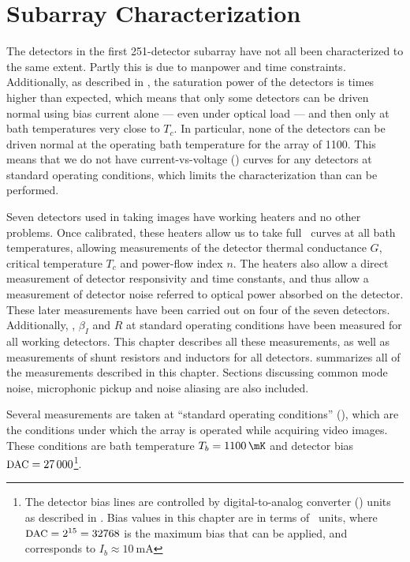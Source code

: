 \chapter{Subarray Characterization}\label{c:det-array}

The detectors in the first 251-detector subarray have not all been characterized to the same extent.
Partly this is due to manpower and time constraints.
Additionally, as described in , the saturation power of the detectors is  times higher than expected, which means that only some detectors can be driven normal using bias current alone --- even under optical load --- and then only at bath temperatures very close to $T_c$.
In particular, none of the detectors can be driven normal at the operating bath temperature for the array of \SI{1100}{\mK}.
This means that we do not have current-vs-voltage (\IV) curves for any detectors at standard operating conditions, which limits the characterization than can be performed.

Seven detectors used in taking images have working heaters and no other problems.
Once calibrated, these heaters allow us to take full \IV\ curves at all bath temperatures, allowing measurements of the detector thermal conductance $G$, critical temperature $T_c$ and power-flow index $n$.
The heaters also allow a direct measurement of detector responsivity and time constants, and thus allow a measurement of detector noise referred to optical power absorbed on the detector.
These later measurements have been carried out on four of the seven detectors.
Additionally, \Loop, $\beta_I$ and $R$ at standard operating conditions have been measured for all working detectors.
This chapter describes all these measurements, as well as measurements of shunt resistors and inductors for all detectors.
 summarizes all of the measurements described in this chapter.
Sections discussing common mode noise, microphonic pickup and noise aliasing are also included.

Several measurements are taken at ``standard operating conditions'' (\SOC), which are the conditions under which the array is operated while acquiring video images.
These conditions are bath temperature $T_b = \SI{1100}{\mK}$ and detector bias $\mbox{{\small DAC}} = \num{27000}$\footnote{The detector bias lines are controlled by digital-to-analog converter (\DAC) units as described in . Bias values in this chapter are in terms of \DAC\ units, where $\mbox{{\small DAC}} = 2^{15} = 32768$ is the maximum bias that can be applied, and corresponds to $I_b \approx \SI{10}{\mA}$}.

